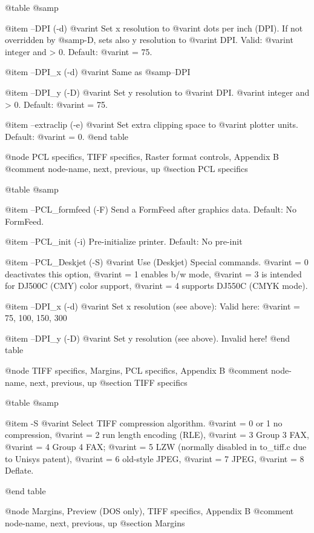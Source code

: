 @table @samp

@item --DPI (-d) @var{int}
Set x resolution to @var{int} dots per inch (DPI). If not overridden
by @samp{-D}, sets also y resolution to @var{int} DPI.
Valid: @var{int} integer and > 0. Default: @var{int} = 75.

@item --DPI_x (-d) @var{int}
Same as @samp{--DPI}

@item --DPI_y (-D) @var{int}
Set y resolution to @var{int} DPI. @var{int} integer and > 0.
Default: @var{int} = 75.

@item --extraclip (-e) @var{int}
Set extra clipping space to @var{int} plotter units. Default: @var{int} = 0.
@end table



@node PCL specifics, TIFF specifics, Raster format controls, Appendix B
@comment  node-name,  next,  previous,  up
@section  PCL specifics

@table @samp

@item --PCL_formfeed (-F)
Send a FormFeed after graphics data. Default: No FormFeed.

@item --PCL_init (-i)
Pre-initialize printer. Default: No pre-init

@item --PCL_Deskjet (-S) @var{int}
Use (Deskjet) Special commands. @var{int} = 0 deactivates this option,
@var{int} = 1 enables b/w mode, @var{int} = 3 is intended for DJ500C
(CMY) color support, @var{int} = 4 supports DJ550C (CMYK mode).

@item --DPI_x (-d) @var{int}
Set x resolution (see above): Valid here: @var{int} = 75, 100, 150, 300

@item --DPI_y (-D) @var{int}
Set y resolution (see above). Invalid here!
@end table

@node TIFF specifics, Margins, PCL specifics, Appendix B
@comment  node-name,  next,  previous,  up
@section TIFF specifics

@table @samp


@item -S @var{int}
Select TIFF compression algorithm. @var{int} = 0 or 1 no compression,
@var{int} = 2 run length encoding (RLE), @var{int} = 3 Group 3 FAX,
@var{int} = 4 Group 4 FAX; @var{int} = 5 LZW (normally disabled in to_tiff.c
due to Unisys patent), @var{int} = 6 old-style JPEG, @var{int} = 7 JPEG,
@var{int} = 8 Deflate.

@end table



@node Margins, Preview (DOS only), TIFF specifics, Appendix B
@comment  node-name,  next,  previous,  up
@section  Margins

